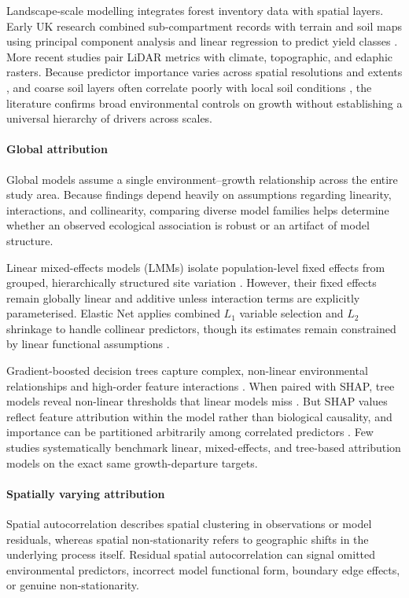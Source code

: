 \documentclass[logo,msc,ai]{infthesis}           %
\begin{document}
Landscape-scale modelling integrates forest inventory data with spatial layers. Early UK research combined sub-compartment records with terrain and soil maps using principal component analysis and linear regression to predict yield classes \cite{bateman1998Using_C1_SS}. More recent studies pair LiDAR metrics with climate, topographic, and edaphic rasters. Because predictor importance varies across spatial resolutions and extents \cite{fricker2019More_C3_LID}, and coarse soil layers often correlate poorly with local soil conditions \cite{miller2024Assessing_C2_CR}, the literature confirms broad environmental controls on growth without establishing a universal hierarchy of drivers across scales.

\paragraph*{Global attribution}
Global models assume a single environment--growth relationship across the entire study area. Because findings depend heavily on assumptions regarding linearity, interactions, and collinearity, comparing diverse model families helps determine whether an observed ecological association is robust or an artifact of model structure.

Linear mixed-effects models (LMMs) isolate population-level fixed effects from grouped, hierarchically structured site variation \cite{harrison2018Brief_LMM, socha2016Assessment_C2_CR}. However, their fixed effects remain globally linear and additive unless interaction terms are explicitly parameterised. Elastic Net applies combined $L_1$ variable selection and $L_2$ shrinkage to handle collinear predictors, though its estimates remain constrained by linear functional assumptions \cite{zou2005Regularization_C4_NN}.

Gradient-boosted decision trees capture complex, non-linear environmental relationships and high-order feature interactions \cite{puliti2023Tree_C2_CR, chen2016XGBoost_C4_NN}. When paired with SHAP, tree models reveal non-linear thresholds that linear models miss \cite{lundberg2017Unified_C7_XAI}. But SHAP values reflect feature attribution within the model rather than biological causality, and importance can be partitioned arbitrarily among correlated predictors \cite{aas2021Explaining_C7_XAI}. Few studies systematically benchmark linear, mixed-effects, and tree-based attribution models on the exact same growth-departure targets.

\paragraph*{Spatially varying attribution}
Spatial autocorrelation describes spatial clustering in observations or model residuals, whereas spatial non-stationarity refers to geographic shifts in the underlying process itself. Residual spatial autocorrelation can signal omitted environmental predictors, incorrect model functional form, boundary edge effects, or genuine non-stationarity. 
\end{document}

